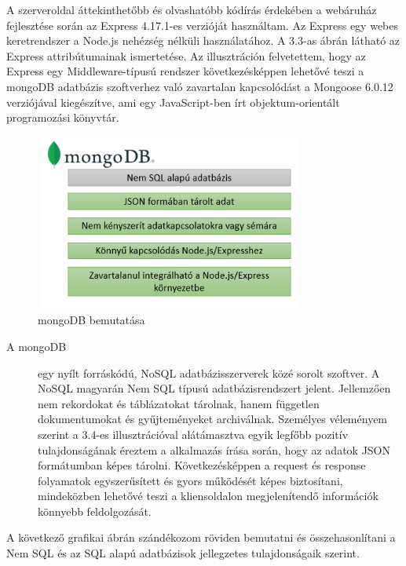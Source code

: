 A szerveroldal áttekinthetőbb és olvashatóbb kódírás érdekében a webáruház fejlesztése során az Express 4.17.1-es verzióját használtam. Az Express egy webes keretrendszer a Node.js nehézség nélküli használatához. A 3.3-as ábrán látható az Express attribútumainak ismertetése. Az illusztráción felvetettem, hogy az Express egy Middleware-típusú rendszer következésképpen lehetővé teszi a mongoDB adatbázis szoftverhez való zavartalan kapcsolódást a Mongoose 6.0.12 verziójával kiegészítve, ami egy JavaScript-ben írt objektum-orientált programozási könyvtár.

\begin{figure}[H]
	\centering
	\includegraphics[width=0.8\textwidth,height=220px]{images/mongodb_bemutatasa.png}
	\caption{mongoDB bemutatása}
	\label{fig.picture-5}
\end{figure}

\begin{description}
	\item[A mongoDB]egy nyílt forráskódú, NoSQL adatbázisszerverek közé sorolt szoftver. A NoSQL magyarán Nem SQL típusú adatbázisrendszert jelent. Jellemzően nem rekordokat és táblázatokat tárolnak, hanem független dokumentumokat és gyűjteményeket archiválnak. Személyes véleményem szerint a 3.4-es illusztrációval alátámasztva egyik legfőbb pozitív tulajdonságának éreztem a alkalmazás írása során, hogy az adatok JSON formátumban képes tárolni. Következésképpen a request és response folyamatok egyszerűsített és gyors működését képes biztosítani, mindeközben lehetővé teszi a kliensoldalon megjelenítendő információk könnyebb feldolgozását. 
\end{description}
 
A következő grafikai ábrán szándékozom röviden bemutatni és összehasonlítani a Nem SQL és az SQL alapú adatbázisok jellegzetes tulajdonságaik szerint.

